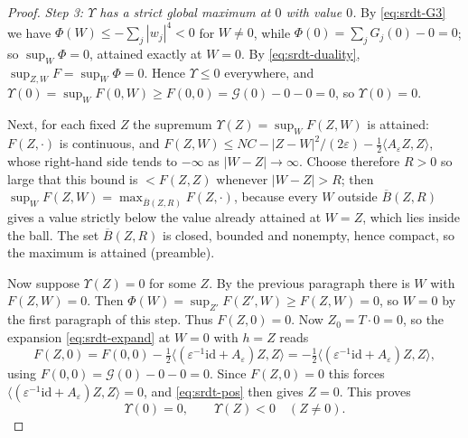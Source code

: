 \begin{proof}
\emph{Step 3: $\Upsilon$ has a strict global maximum at $0$ with value $0$.}
By \eqref{eq:srdt-G3} we have $\Phi(W)\le-\sum_j|w_j|^4<0$ for $W\ne0$, while
$\Phi(0)=\sum_jG_j(0)-0=0$; so $\sup_W\Phi=0$, attained exactly at $W=0$. By
\eqref{eq:srdt-duality}, $\sup_{Z,W}F=\sup_W\Phi=0$. Hence $\Upsilon\le0$
everywhere, and $\Upsilon(0)=\sup_WF(0,W)\ge F(0,0)=\mathcal G(0)-0-0=0$, so
$\Upsilon(0)=0$.

Next, for each fixed $Z$ the supremum $\Upsilon(Z)=\sup_WF(Z,W)$ is attained:
$F(Z,\cdot)$ is continuous, and
$F(Z,W)\le NC-|Z-W|^2/(2\varepsilon)
-\tfrac12\langle A_\varepsilon Z,Z\rangle$, whose right-hand side tends to
$-\infty$ as $|W-Z|\to\infty$. Choose therefore $R>0$ so large that this bound
is $<F(Z,Z)$ whenever $|W-Z|>R$; then
$\sup_WF(Z,W)=\max_{\overline B(Z,R)}F(Z,\cdot)$, because every $W$ outside
$\overline B(Z,R)$ gives a value strictly below the value already attained at
$W=Z$, which lies inside the ball. The set $\overline B(Z,R)$ is closed,
bounded and nonempty, hence compact, so the maximum is attained (preamble).

Now suppose $\Upsilon(Z)=0$ for some $Z$. By the previous paragraph there is $W$
with $F(Z,W)=0$. Then $\Phi(W)=\sup_{Z'}F(Z',W)\ge F(Z,W)=0$, so $W=0$ by the
first paragraph of this step. Thus $F(Z,0)=0$. Now $Z_0=T\cdot0=0$, so the
expansion \eqref{eq:srdt-expand} at $W=0$ with $h=Z$ reads
\[
  F(Z,0)=F(0,0)
   -\tfrac12\bigl\langle(\varepsilon^{-1}\mathrm{id}+A_\varepsilon)Z,Z\bigr\rangle
   =-\tfrac12\bigl\langle(\varepsilon^{-1}\mathrm{id}
     +A_\varepsilon)Z,Z\bigr\rangle,
\]
using $F(0,0)=\mathcal G(0)-0-0=0$. Since $F(Z,0)=0$ this forces
$\langle(\varepsilon^{-1}\mathrm{id}+A_\varepsilon)Z,Z\rangle=0$, and
\eqref{eq:srdt-pos} then gives $Z=0$. This proves
\[
  \Upsilon(0)=0,\qquad\Upsilon(Z)<0\quad(Z\ne0).
\]


\end{proof}

